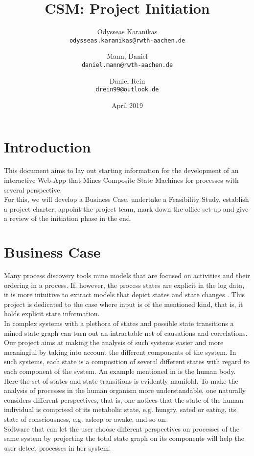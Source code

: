 \documentclass[12pt]{extarticle}
\title{CSM: Project Initiation}
\author{
Odysseas Karanikas\\
\texttt{odysseas.karanikas@rwth-aachen.de}
\and
Mann, Daniel\\
\texttt{daniel.mann@rwth-aachen.de}
\and
Daniel Rein\\
\texttt{drein99@outlook.de}
}
\date{April 2019}
\begin{document}
\maketitle

\section{Introduction}

This document aims to lay out starting information for the development of an interactive Web-App that Mines Composite State Machines for processes with several perspective.\\
For this, we will develop a Business Case, undertake a Feasibility Study, establish a project charter, appoint the project team, mark down the office set-up and give a review of the initiation phase in the end.

\section{Business Case}

Many process discovery tools mine models that are focused on activities and their ordering in a process. If, however, the process states are explicit in the log data, it is more intuitive to extract models that depict states and state changes \cite{csm-intro}. This project is dedicated to the case where input is of the mentioned kind, that is, it holds explicit state information.\\
In complex systems with a plethora of states and possible state transitions a mined state graph can turn out an intractable net of causations and correlations. Our project aims at making the analysis of such systems easier and more meaningful by taking into account the different components of the system. In such systems, each state is a composition of several different states with regard to each component of the system. An example mentioned in \cite{csm-intro} is the human body. Here the set of states and state transitions is evidently manifold. To make the analysis of processes in the human organism more understandable, one naturally considers different perspectives, that is, one notices that the state of the human individual is comprised of its metabolic state, e.g. hungry, sated or eating, its state of consciousness, e.g. asleep or awake, and so on.\\
Software that can let the user choose different perspectives on processes of the same system by projecting the total state graph on its components will help the user detect processes in her system.\\
\end{document}
